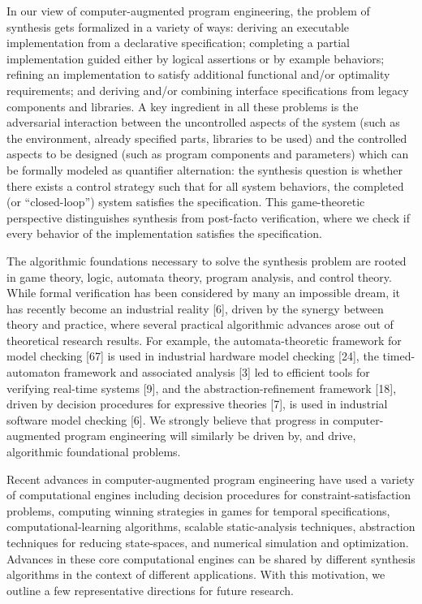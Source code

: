 In our view of computer-augmented program engineering, the problem of synthesis gets formalized in a variety of ways: deriving an executable implementation from a declarative specification; completing a partial implementation guided either by logical assertions or by example behaviors; refining an implementation to satisfy additional functional and/or optimality requirements; and deriving and/or combining interface specifications from legacy components and libraries. A key ingredient in all these problems is the adversarial interaction between the uncontrolled aspects of the system (such as the environment, already specified parts, libraries to be used) and the controlled aspects to be designed (such as program components and parameters) which can be formally modeled as quantifier alternation: the synthesis question is whether there exists a control strategy such that for all system behaviors, the completed (or “closed-loop”) system satisfies the specification. This game-theoretic perspective distinguishes synthesis from post-facto verification, where we check if every behavior of the implementation satisfies the specification.


The algorithmic foundations necessary to solve the synthesis problem are rooted in game theory, logic, automata theory, program analysis, and control theory. While formal verification has been considered by many an impossible dream, it has recently become an industrial reality [6], driven by the synergy between theory and practice, where several practical algorithmic advances arose out of theoretical research results. For example, the automata-theoretic framework for model checking [67] is used in industrial hardware model checking [24], the timed-automaton framework and associated analysis [3] led to efficient tools for verifying real-time systems [9], and the abstraction-refinement framework [18], driven by decision procedures for expressive theories [7], is used in industrial software model checking [6]. We strongly believe that progress in computer-augmented program engineering will similarly be driven by, and drive, algorithmic foundational problems.

Recent advances in computer-augmented program engineering have used a variety of computational engines including decision procedures for constraint-satisfaction problems, computing winning strategies in games for temporal specifications, computational-learning algorithms, scalable static-analysis techniques, abstraction techniques for reducing state-spaces, and numerical simulation and optimization. Advances in these core computational engines can be shared by different synthesis algorithms in the context of different applications. With this motivation, we outline a few representative directions for future research.

